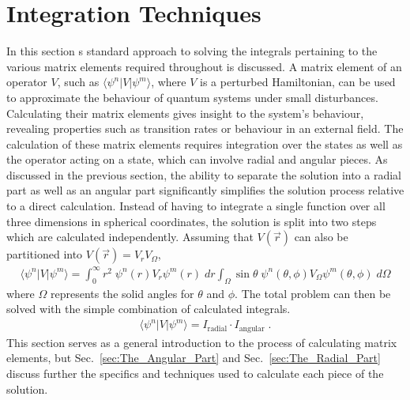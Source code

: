     \section{Integration Techniques} \label{sec:Integration_Techniques}
        In this section s standard approach to solving the integrals pertaining to the various matrix elements required throughout is discussed. A matrix element of an operator $V$, such as $\langle\psi^n \vert V \vert \psi^m \rangle$, where $V$ is a perturbed Hamiltonian, can be used to approximate the behaviour of quantum systems under small disturbances. Calculating their matrix elements gives insight to the system's behaviour, revealing properties such as transition rates or behaviour in an external field. The calculation of these matrix elements requires integration over the states as well as the operator acting on a state, which can involve radial and angular pieces. As discussed in the previous section, the ability to separate the solution into a radial part as well as an angular part significantly simplifies the solution process relative to a direct calculation. Instead of having to integrate a single function over all three dimensions in spherical coordinates, the solution is split into two steps which are calculated independently. Assuming that $V(\vec{r})$ can also be partitioned into $V(\vec{r}) = V_r V_\Omega$,
        \begin{align}
            \langle \psi^n \vert V \vert \psi^m \rangle = \int_{0}^{\infty} r^2 \; \psi^n(r) V_r \psi^m(r) \; dr \int_\Omega \sin \theta \; \psi^n(\theta, \phi) V_\Omega \psi^m(\theta, \phi) \; d\Omega
        \end{align}
        \noindent where $\Omega$ represents the solid angles for $\theta$ and $\phi$. The total problem can then be solved with the simple combination of calculated integrals.
        \begin{align}
             \langle \psi^n \vert V \vert \psi^m \rangle = I_{\text{radial}} \cdot I_{\text{angular}}\;.
        \end{align}
        \noindent This section serves as a general introduction to the process of calculating matrix elements, but Sec.~\ref{sec:The_Angular_Part} and Sec.~\ref{sec:The_Radial_Part} discuss further the specifics and techniques used to calculate each piece of the solution.

